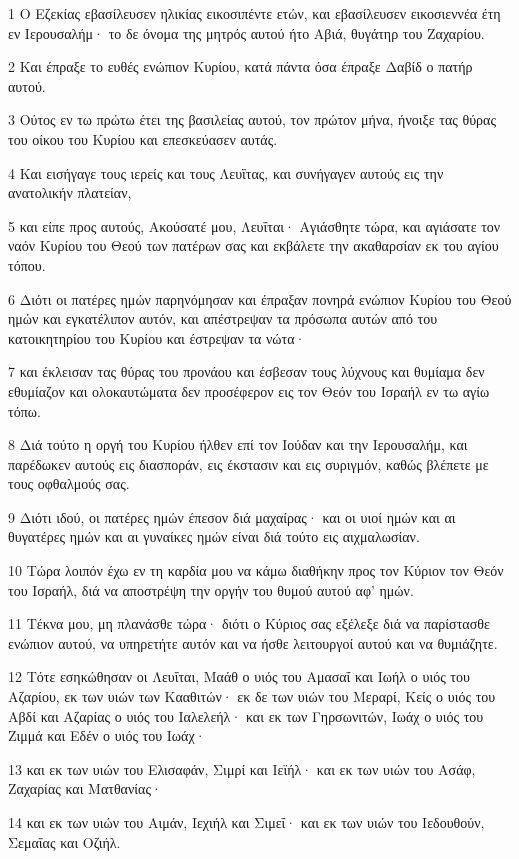 \par 1 Ο Εζεκίας εβασίλευσεν ηλικίας εικοσιπέντε ετών, και εβασίλευσεν εικοσιεννέα έτη εν Ιερουσαλήμ· το δε όνομα της μητρός αυτού ήτο Αβιά, θυγάτηρ του Ζαχαρίου.
\par 2 Και έπραξε το ευθές ενώπιον Κυρίου, κατά πάντα όσα έπραξε Δαβίδ ο πατήρ αυτού.
\par 3 Ούτος εν τω πρώτω έτει της βασιλείας αυτού, τον πρώτον μήνα, ήνοιξε τας θύρας του οίκου του Κυρίου και επεσκεύασεν αυτάς.
\par 4 Και εισήγαγε τους ιερείς και τους Λευΐτας, και συνήγαγεν αυτούς εις την ανατολικήν πλατείαν,
\par 5 και είπε προς αυτούς, Ακούσατέ μου, Λευΐται· Αγιάσθητε τώρα, και αγιάσατε τον ναόν Κυρίου του Θεού των πατέρων σας και εκβάλετε την ακαθαρσίαν εκ του αγίου τόπου.
\par 6 Διότι οι πατέρες ημών παρηνόμησαν και έπραξαν πονηρά ενώπιον Κυρίου του Θεού ημών και εγκατέλιπον αυτόν, και απέστρεψαν τα πρόσωπα αυτών από του κατοικητηρίου του Κυρίου και έστρεψαν τα νώτα·
\par 7 και έκλεισαν τας θύρας του προνάου και έσβεσαν τους λύχνους και θυμίαμα δεν εθυμίαζον και ολοκαυτώματα δεν προσέφερον εις τον Θεόν του Ισραήλ εν τω αγίω τόπω.
\par 8 Διά τούτο η οργή του Κυρίου ήλθεν επί τον Ιούδαν και την Ιερουσαλήμ, και παρέδωκεν αυτούς εις διασποράν, εις έκστασιν και εις συριγμόν, καθώς βλέπετε με τους οφθαλμούς σας.
\par 9 Διότι ιδού, οι πατέρες ημών έπεσον διά μαχαίρας· και οι υιοί ημών και αι θυγατέρες ημών και αι γυναίκες ημών είναι διά τούτο εις αιχμαλωσίαν.
\par 10 Τώρα λοιπόν έχω εν τη καρδία μου να κάμω διαθήκην προς τον Κύριον τον Θεόν του Ισραήλ, διά να αποστρέψη την οργήν του θυμού αυτού αφ' ημών.
\par 11 Τέκνα μου, μη πλανάσθε τώρα· διότι ο Κύριος σας εξέλεξε διά να παρίστασθε ενώπιον αυτού, να υπηρετήτε αυτόν και να ήσθε λειτουργοί αυτού και να θυμιάζητε.
\par 12 Τότε εσηκώθησαν οι Λευΐται, Μαάθ ο υιός του Αμασαΐ και Ιωήλ ο υιός του Αζαρίου, εκ των υιών των Κααθιτών· εκ δε των υιών του Μεραρί, Κείς ο υιός του Αβδί και Αζαρίας ο υιός του Ιαλελεήλ· και εκ των Γηρσωνιτών, Ιωάχ ο υιός του Ζιμμά και Εδέν ο υιός του Ιωάχ·
\par 13 και εκ των υιών του Ελισαφάν, Σιμρί και Ιεϊήλ· και εκ των υιών του Ασάφ, Ζαχαρίας και Ματθανίας·
\par 14 και εκ των υιών του Αιμάν, Ιεχιήλ και Σιμεΐ· και εκ των υιών του Ιεδουθούν, Σεμαΐας και Οζιήλ.
